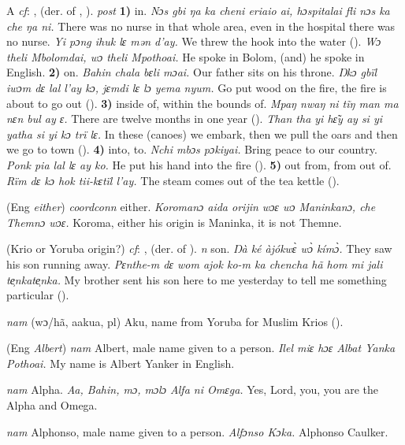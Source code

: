 \begin{letter}{A}
 \textit{cf}: ,  (der. of , ). \textit{post} \textbf{1)} in. \textit{Nɔs gbi ŋa ka cheni eriaio ai, hɔspitalai fli nɔs ka che ŋa ni.} There was no nurse in that whole area, even in the hospital there was no nurse. \textit{Yi pɔng ihuk lɛ mən d'ay.} We threw the hook into the water (\citealt{Pichl1967}). \textit{Wɔ theli Mbolomdai, wɔ theli Mpothoai.} He spoke in Bolom, (and) he spoke in English. \textbf{2)} on. \textit{Bahin chala bɛli mɔai.} Our father sits on his throne. \textit{Ŋkɔ gbïl iwɔm dɛ lal l'ay kɔ, jɛmdi lɛ lɔ yema nyum.} Go put wood on the fire, the fire is about to go out (\citealt{Pichl1967}). \textbf{3)} inside of, within the bounds of. \textit{Mpaŋ nwaŋ ni tĩŋ man ma nɛn bul ay ɛ.} There are twelve months in one year (\citealt{Pichl1967}). \textit{Than tha yi hɛ̃y ay si yi yatha si yi kɔ trï lɛ.} In these (canoes) we embark, then we pull the oars and then we go to town (\citealt{Pichl1967}). \textbf{4)} into, to. \textit{Nchi mbɔs pɔkiyai.} Bring peace to our country. \textit{Ponk pia lal lɛ ay ko.} He put his hand into the fire (\citealt{Pichl1967}). \textbf{5)} out from, from out of. \textit{Rïm dɛ kɔ hok tii-kɛtïl l'ay.} The steam comes out of the tea kettle (\citealt{Pichl1967}).

 (Eng \textit{either}) \textit{coordconn} either. \textit{Koromanɔ aida orijin wɔɛ wɔ Maninkanɔ, che Themnɔ wɔɛ.} Koroma, either his origin is Maninka, it is not Themne. 

 (Krio or Yoruba origin?) \textit{cf}: ,  (der. of ). \textit{n} son. \textit{Ŋà ké àjókwɛ̀ wɔ̀ kímɔ̀.} They saw his son running away. \textit{Pɛnthe-m dɛ wom ajok ko-m ka chencha hã hom mi jali te̹nkate̹nka.} My brother sent his son here to me yesterday to tell me something particular (\citealt{Pichl1967}).

 \textit{nam} (wɔ/hã, aakua, pl) Aku, name from Yoruba for Muslim Krios (\citealt{Pichl1967}). 

 (Eng \textit{Albert}) \textit{nam} Albert, male name given to a person. \textit{Ilel miɛ hɔɛ Albat Yanka Pothoai.} My name is Albert Yanker in English. 

 \textit{nam} Alpha. \textit{Aa, Bahin, mɔ, mɔlɔ Alfa ni Omɛga.} Yes, Lord, you, you are the Alpha and Omega.

 \textit{nam} Alphonso, male name given to a person. \textit{Alfɔnso Kɔka.} Alphonso Caulker.


\end{letter}
